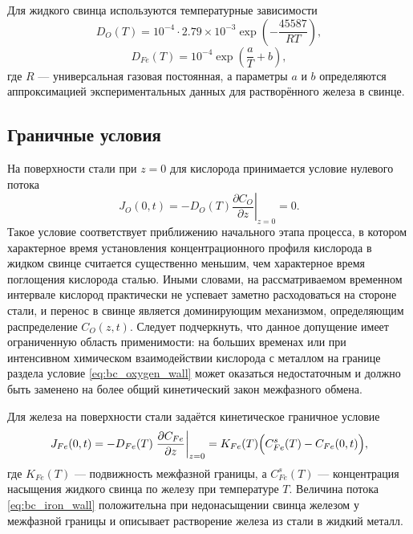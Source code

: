 \documentclass[12pt, a4paper]{article}
\begin{document}
Для жидкого свинца используются температурные зависимости
\begin{equation}
D_O(T)=10^{-4}\cdot 2.79\times 10^{-3}\exp\left(-\frac{45587}{RT}\right),
\end{equation}
\begin{equation}
D_{Fe}(T)=10^{-4}\exp\left(\frac{a}{T}+b\right),
\end{equation}
где $R$ --- универсальная газовая постоянная, а параметры $a$ и $b$ определяются аппроксимацией экспериментальных данных для растворённого железа в свинце.

\subsection*{Граничные условия}

На поверхности стали при $z=0$ для кислорода принимается условие нулевого потока
\begin{equation}
J_O(0,t)= -D_O(T)\left.\frac{\partial C_O}{\partial z}\right|_{z=0}=0.
\label{eq:bc_oxygen_wall}
\end{equation}
Такое условие соответствует приближению начального этапа процесса, в котором характерное время установления концентрационного профиля кислорода в жидком свинце считается существенно меньшим, чем характерное время поглощения кислорода сталью. Иными словами, на рассматриваемом временном интервале кислород практически не успевает заметно расходоваться на стороне стали, и перенос в свинце является доминирующим механизмом, определяющим распределение $C_O(z,t)$. Следует подчеркнуть, что данное допущение имеет ограниченную область применимости: на больших временах или при интенсивном химическом взаимодействии кислорода с металлом на границе раздела условие \eqref{eq:bc_oxygen_wall} может оказаться недостаточным и должно быть заменено на более общий кинетический закон межфазного обмена.

Для железа на поверхности стали задаётся кинетическое граничное условие
\begin{equation}
J_{Fe}(0,t)= -D_{Fe}(T)\left.\frac{\partial C_{Fe}}{\partial z}\right|_{z=0}
=K_{Fe}(T)\Bigl(C_{Fe}^{s}(T)-C_{Fe}(0,t)\Bigr),
\label{eq:bc_iron_wall}
\end{equation}
где $K_{Fe}(T)$ --- подвижность межфазной границы, а $C_{Fe}^{s}(T)$ --- концентрация насыщения жидкого свинца по железу при температуре $T$. Величина потока \eqref{eq:bc_iron_wall} положительна при недонасыщении свинца железом у межфазной границы и описывает растворение железа из стали в жидкий металл.
\end{document}
